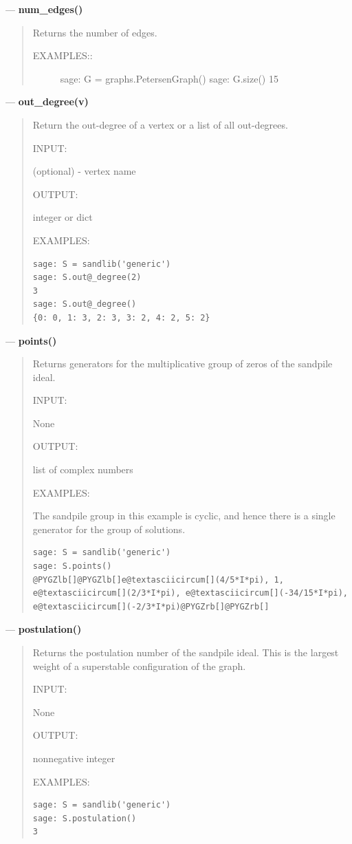 \documentclass[letterpaper,10pt,english]{manual}
\begin{document}
---
\hypertarget{num-edges}{}
\textbf{num\_edges()}
\begin{quote}

Returns the number of edges.
\begin{description}
\item[EXAMPLES::]
sage: G = graphs.PetersenGraph()
sage: G.size()
15

\end{description}
\end{quote}

---
\hypertarget{out-degree-v}{}
\textbf{out\_degree(v)}
\begin{quote}

Return the out-degree of a vertex or a list of all out-degrees.

INPUT:

 (optional) - vertex name

OUTPUT:

integer or dict

EXAMPLES:

\begin{Verbatim}[commandchars=@\[\]]
sage: S = sandlib('generic')
sage: S.out@_degree(2)
3
sage: S.out@_degree()
{0: 0, 1: 3, 2: 3, 3: 2, 4: 2, 5: 2}
\end{Verbatim}
\end{quote}

---
\hypertarget{points}{}
\textbf{points()}
\begin{quote}

Returns generators for the multiplicative group of zeros of the sandpile
ideal.

INPUT:

None

OUTPUT:

list of complex numbers

EXAMPLES:

The sandpile group in this example is cyclic, and hence there is a
single generator for the group of solutions.

\begin{Verbatim}[commandchars=@\[\]]
sage: S = sandlib('generic')
sage: S.points()
@PYGZlb[]@PYGZlb[]e@textasciicircum[](4/5*I*pi), 1, e@textasciicircum[](2/3*I*pi), e@textasciicircum[](-34/15*I*pi), e@textasciicircum[](-2/3*I*pi)@PYGZrb[]@PYGZrb[]
\end{Verbatim}
\end{quote}

---
\hypertarget{postulation}{}
\textbf{postulation()}
\begin{quote}

Returns the postulation number of the sandpile ideal.  This is the
largest weight of a superstable configuration of the graph.

INPUT:

None

OUTPUT:

nonnegative integer

EXAMPLES:

\begin{Verbatim}[commandchars=@\[\]]
sage: S = sandlib('generic')
sage: S.postulation()
3
\end{Verbatim}
\end{quote}
\end{document}
